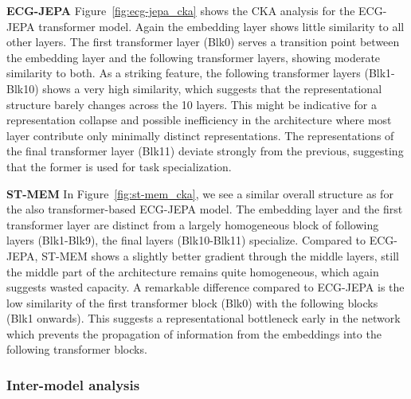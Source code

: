 \documentclass{article}
\newcommand{\heading}[1]{\noindent\textbf{#1}}
\begin{document}
            \heading{ECG-JEPA} Figure~\ref{fig:ecg-jepa_cka} shows the CKA analysis for the ECG-JEPA transformer model. Again the embedding layer shows little similarity to all other layers. The first transformer layer (Blk0) serves a transition point between the embedding layer and the following transformer layers, showing moderate similarity to both. As a striking feature, the following transformer layers (Blk1-Blk10) shows a very high similarity, which suggests that the representational structure barely changes across the 10 layers. This might be indicative for a representation collapse and possible inefficiency in the architecture where most layer contribute only minimally distinct representations. The representations of the final transformer layer (Blk11) deviate strongly from the previous, suggesting that the former is used for task specialization.
            
            \heading{ST-MEM} In Figure~\ref{fig:st-mem_cka}, we see a similar overall structure as for the also transformer-based ECG-JEPA model. The embedding layer and the first transformer layer are distinct from a largely homogeneous block of following layers (Blk1-Blk9), the final layers (Blk10-Blk11) specialize. Compared to ECG-JEPA, ST-MEM shows a slightly better gradient through the middle layers, still the middle part of the architecture remains quite homogeneous, which again suggests wasted capacity. A remarkable difference compared to ECG-JEPA is the low similarity of the first transformer block (Blk0) with the following blocks (Blk1 onwards). This suggests a representational bottleneck early in the network which prevents the propagation of information from the embeddings into the following transformer blocks.


            \subsubsection{Inter-model analysis}
\end{document}
